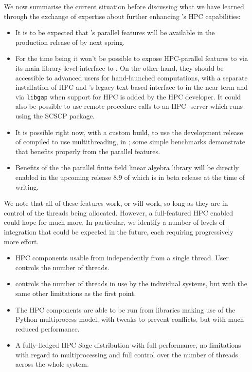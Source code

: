 \documentclass{deliverablereport}
\begin{document}
We now summarise the current situation before discussing what we have learned through
the exchange of expertise about further enhancing \SageMath's HPC capabilities:
\begin{itemize}
\item It is to be expected that \Singular's parallel features will be
  available in the production release of \SageMath by next spring.
\item For the time being it won't be possible to expose HPC-\GAP parallel
  features to \SageMath via its main library-level interface to \GAP. On the
  other hand, they should be accessible to advanced users for hand-launched
  computations, with a separate installation of HPC-\GAP and \Sage's legacy
  text-based interface to \GAP in the near term and via \texttt{libgap} when
  support for HPC \GAP is added by the HPC \GAP developer. It could also be
  possible to use remote procedure calls to an HPC-\GAP 
  server which runs using the SCSCP \GAP package.
\item It is possible right now, with a custom build, to use the development
  release of \Pari compiled to use multithreading, in \SageMath;
  some simple benchmarks demonstrate that \Sage benefits properly from the
  parallel features.
\item Benefits of the the parallel finite field linear algebra library \Linbox
  will be directly enabled in the upcoming release 8.9 of \SageMath which is in
  beta release at the time of writing.
\end{itemize}

We note that all of these features work, or will work, so long as they are in
control of the threads being allocated. However, a full-featured HPC enabled
\SageMath could hope for much more. In particular, we identify a number of levels
of integration that could be expected in the future, each requiring progressively
more effort.

\begin{itemize}
\item HPC components usable from \SageMath independently from a single \Python
  thread. User controls the number of threads.

\item \SageMath controls the number of threads in use by the individual systems,
  but with the same other limitations as the first point.
  
\item The HPC components are able to be run from libraries making use of the
  Python multiprocess model, with tweaks to prevent conflicts, but with much
  reduced performance.
  
\item A fully-fledged HPC Sage distribution with full performance, no limitations
  with regard to multiprocessing and full control over the number of threads
  across the whole system.
\end{itemize}
\end{document}
